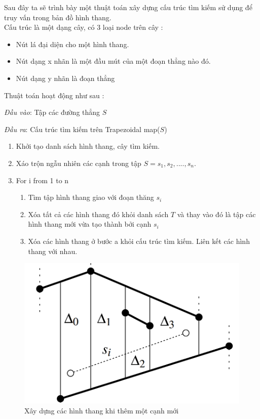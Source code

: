 \documentclass[a4paper,12pt]{report}
\begin{document}
Sau đây ta sẽ trình bày một thuật toán xây dựng cấu trúc tìm kiếm sử dụng để truy vấn trong bản đồ hình thang.\\

Cấu trúc là một dạng cây, có 3 loại node trên cây :
\begin{itemize}
\item Nút lá đại diện cho một hình thang.
\item Nút dạng x nhãn là một đầu mút của một đoạn thẳng nào đó.
\item Nút dạng y nhãn là đoạn thẳng
\end{itemize}

Thuật toán hoạt động như sau :

\emph{Đầu vào}: Tập các đường thẳng $S$

\emph{Đầu ra}: Cấu trúc tìm kiếm trên Trapezoidal map($S$)

\begin{enumerate}
\item Khởi tạo danh sách hình thang, cây tìm kiếm.
\item Xáo trộn  ngẫu nhiên các cạnh trong tập $S = {s_1, s_2, ...., s_n}$.
\item For i from 1 to n  
\begin{enumerate}
\item Tìm tập hình thang giao với đoạn thăng $s_i$
\item Xóa tất cả các hình thang đó khỏi danh sách $T$ và thay vào đó là tập các hình thang mới vừa tạo thành bởi cạnh $s_i$
\item Xóa các hình thang ở bước a khỏi cấu trúc tìm kiếm. Liên kết các hình thang với nhau.
\end{enumerate}
\end{enumerate}
\begin{figure}[H]
\centering
\includegraphics[scale=0.28]{trmap2.png}
\caption{Xây dựng các hình thang khi thêm một cạnh mới}
\label{object_pic}
\end{figure}
\end{document}
